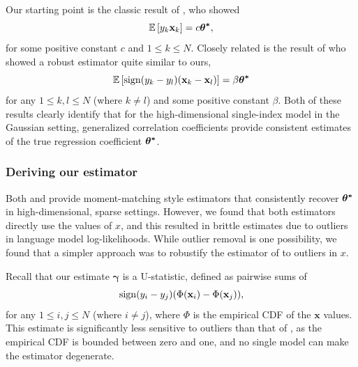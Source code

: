 \documentclass{article} %
\begin{document}
Our starting point is the classic result of \citet{plan2016high}, who showed 
\begin{equation}\label{eq:plan}
\mathbb{E}\left[y_k\mathbf{x}_k\right] = c\bm{{\bf{\theta}^*}},
\end{equation}
for some positive constant $c$ and $1 \leq k \leq N$. Closely related is the result of \citet{chen2017robust} who showed a robust estimator quite similar to ours,
\begin{equation}
\mathbb{E}\left[\operatorname{sign}(y_k - y_l) (\mathbf{x}_k - \mathbf{x}_l)\right] = \beta\bm{{\bf{\theta}^*}}
\end{equation}
for any $1 \leq k,l \leq N$ (where $k \neq l$) and some positive constant $\beta$. Both of these results clearly identify that for the high-dimensional single-index model in the Gaussian setting, generalized correlation coefficients provide consistent estimates of the true regression coefficient $\bm{{\bf{\theta}^*}}$.

\subsubsection{Deriving our estimator}

Both \citeauthor{plan2016high} and \citeauthor{chen2017robust} provide moment-matching style estimators that consistently recover $\bm{{\bf{\theta}^*}}$ in high-dimensional, sparse settings. However, we found that both estimators directly use the values of $x$, and this resulted in brittle estimates due to outliers in language model log-likelihoods. While outlier removal is one possibility, we found that a simpler approach was to robustify the estimator of \citet{chen2017robust} to outliers in $x$.

Recall that our estimate $\bm{\gamma}$ is a U-statistic, defined as pairwise sums of 
\begin{equation}
\operatorname{sign}(y_i - y_j) (\Phi(\mathbf{x}_i) - \Phi(\mathbf{x}_j)),
\end{equation}
for any $1 \leq i,j \leq N$ (where $i \neq j$), where $\Phi$ is the empirical CDF of the $\mathbf{x}$ values. This estimate is significantly less sensitive to outliers than that of \citet{chen2017robust}, as the empirical CDF is bounded between zero and one, and no single model can make the estimator degenerate.
\end{document}
